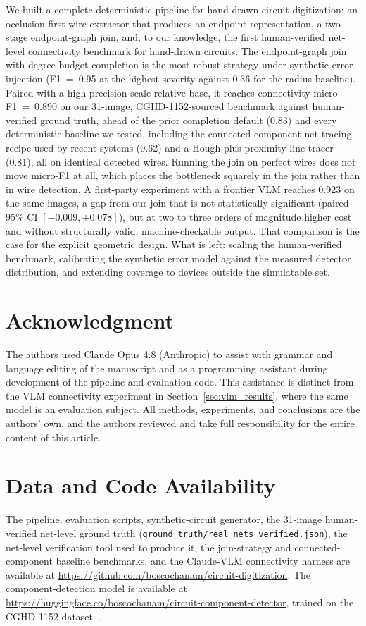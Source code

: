 \documentclass{ieeeaccess}
\begin{document}
We built a complete deterministic pipeline for hand-drawn circuit digitization: an occlusion-first wire extractor that produces an endpoint representation, a two-stage endpoint-graph join, and, to our knowledge, the first human-verified net-level connectivity benchmark for hand-drawn circuits. The endpoint-graph join with degree-budget completion is the most robust strategy under synthetic error injection (F1~=~0.95 at the highest severity against 0.36 for the radius baseline). Paired with a high-precision scale-relative base, it reaches connectivity micro-F1~=~0.890 on our 31-image, CGHD-1152-sourced benchmark against human-verified ground truth, ahead of the prior completion default (0.83) and every deterministic baseline we tested, including the connected-component net-tracing recipe used by recent systems (0.62) and a Hough-plus-proximity line tracer (0.81), all on identical detected wires. Running the join on perfect wires does not move micro-F1 at all, which places the bottleneck squarely in the join rather than in wire detection. A first-party experiment with a frontier VLM reaches 0.923 on the same images, a gap from our join that is not statistically significant (paired 95\% CI $[-0.009, +0.078]$), but at two to three orders of magnitude higher cost and without structurally valid, machine-checkable output. That comparison is the case for the explicit geometric design. What is left: scaling the human-verified benchmark, calibrating the synthetic error model against the measured detector distribution, and extending coverage to devices outside the simulatable set.


\section*{Acknowledgment}
The authors used Claude Opus 4.8 (Anthropic) to assist with grammar and language editing of the manuscript and as a programming assistant during development of the pipeline and evaluation code. This assistance is distinct from the VLM connectivity experiment in Section~\ref{sec:vlm_results}, where the same model is an evaluation subject. All methods, experiments, and conclusions are the authors' own, and the authors reviewed and take full responsibility for the entire content of this article.

\section*{Data and Code Availability}
The pipeline, evaluation scripts, synthetic-circuit generator, the 31-image
human-verified net-level ground truth (\texttt{ground\_truth/real\_nets\_verified.json}),
the net-level verification tool used to produce it, the join-strategy and
connected-component baseline benchmarks, and the Claude-VLM connectivity harness are
available at
\url{https://github.com/boscochanam/circuit-digitization}. The component-detection model
is available at \url{https://huggingface.co/boscochanam/circuit-component-detector}, trained
on the CGHD-1152 dataset~\cite{bayer2021cghd}.
\end{document}
